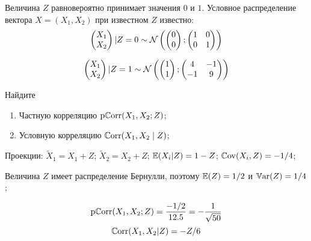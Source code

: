 \begin{problem}
Величина $Z$ равновероятно принимает значения $0$ и $1$. Условное распределение вектора $X=(X_1, X_2)$ при известном $Z$ известно:
\[
  \begin{pmatrix}
    X_1 \\
    X_2 \\
  \end{pmatrix}|Z=0 \sim \mathcal{N}\left(
    \begin{pmatrix}
      0 \\
      0 \\
    \end{pmatrix};
    \begin{pmatrix}
      1 & 0 \\
      0 & 1 \\
    \end{pmatrix}
    \right)
\]

\[
  \begin{pmatrix}
    X_1 \\
    X_2 \\
  \end{pmatrix}|Z=1 \sim \mathcal{N}\left(
    \begin{pmatrix}
      1 \\
      1 \\
    \end{pmatrix};
    \begin{pmatrix}
      4 & -1 \\
      -1 & 9 \\
    \end{pmatrix}
    \right)
\]

Найдите
\begin{enumerate}
  \item Частную корреляцию $\operatorname{\mathrm{p}\mathbb{C}\mathrm{orr}}(X_1, X_2; Z)$;
  \item Условную корреляцию $\operatorname{\mathbb{C}\mathrm{orr}}(X_1, X_2 \mid Z)$;
\end{enumerate}

  \begin{sol}
Проекции: $\tilde X_1 = X_1 + Z$; $\tilde X_2 = X_2 + Z$; $\operatorname{\mathbb{E}}(X_i|Z)=1-Z$; $\operatorname{\mathbb{C}\mathrm{ov}}(X_i, Z)=-1/4$;

Величина $Z$ имеет распределение Бернулли, поэтому $\operatorname{\mathbb{E}}(Z)=1/2$ и $\operatorname{\mathbb{V}\mathrm{ar}}(Z)=1/4$;

\[
  \operatorname{\mathrm{p}\mathbb{C}\mathrm{orr}}(X_1, X_2; Z) = \frac{-1/2}{12.5} = -\frac{1}{\sqrt{50}}
\]
\[
  \operatorname{\mathbb{C}\mathrm{orr}}(X_1, X_2|Z)=-Z/6
\]
  \end{sol}
\end{problem}

